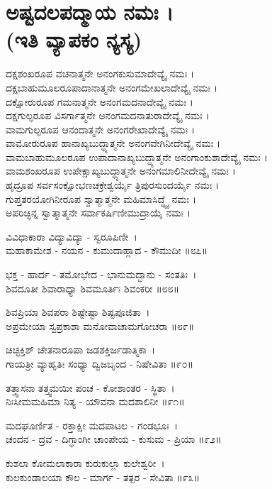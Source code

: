 \section{ಅಷ್ಟದಲಪದ್ಮಾಯ ನಮಃ ।\\ (ಇತಿ ವ್ಯಾಪಕಂ ನ್ಯಸ್ಯ)}
ದಕ್ಷಶಂಖರೂಪ ವಚನಾತ್ಮನೇ ಅನಂಗಕುಸುಮಾದೇವ್ಯೈ ನಮಃ ।\\
ದಕ್ಷಬಾಹುಮೂಲರೂಪಾದಾನಾತ್ಮನೇ ಅನಂಗಮೇಖಲಾದೇವ್ಯೈ ನಮಃ ।\\
ದಕ್ಷೋರುರೂಪ ಗಮನಾತ್ಮನೇ ಅನಂಗಮದನಾದೇವ್ಯೈ ನಮಃ ।\\
ದಕ್ಷಗುಲ್ಫರೂಪ ವಿಸರ್ಗಾತ್ಮನೇ ಅನಂಗಮದನಾತುರಾದೇವ್ಯೈ ನಮಃ ।\\
ವಾಮಗುಲ್ಫರೂಪ ಆನಂದಾತ್ಮನೇ ಅನಂಗರೇಖಾದೇವ್ಯೈ ನಮಃ ।\\
ವಾಮೋರುರೂಪ ಹಾನಾಖ್ಯಬುದ್ಧ್ಯಾತ್ಮನೇ ಅನಂಗವೇಗಿನೀದೇವ್ಯೈ ನಮಃ ।\\
ವಾಮಬಾಹುಮೂಲರೂಪ ಉಪಾದಾನಾಖ್ಯಬುದ್ಧ್ಯಾತ್ಮನೇ ಅನಂಗಾಂಕುಶಾದೇವ್ಯೈ ನಮಃ ।\\
ವಾಮಶಂಖರೂಪ ಉಪೇಕ್ಷಾಖ್ಯಬುದ್ಧ್ಯಾತ್ಮನೇ ಅನಂಗಮಾಲಿನೀದೇವ್ಯೈ ನಮಃ ।\\
ಹೃದ್ರೂಪ ಸರ್ವಸಂಕ್ಷೋಭಣಚಕ್ರೇಶ್ವರ್ಯೈ ತ್ರಿಪುರಸುಂದರ್ಯೈ ನಮಃ ।\\
ಗುಪ್ತತರಯೋಗಿನೀರೂಪ ಸ್ವಾತ್ಮಾತ್ಮನೇ ಮಹಿಮಾಸಿದ್ಧ್ಯೈ ನಮಃ ।\\
ಅಪರಿಚ್ಛಿನ್ನ ಸ್ವಾತ್ಮಾತ್ಮನೇ ಸರ್ವಾಕರ್ಷಿಣೀಮುದ್ರಾಯೈ ನಮಃ ।

ವಿವಿಧಾಕಾರಾ ವಿದ್ಯಾವಿದ್ಯಾ - ಸ್ವರೂಪಿಣೀ~।\\
ಮಹಾಕಾಮೇಶ - ನಯನ - ಕುಮುದಾಹ್ಲಾದ - ಕೌಮುದೀ ॥೮೭॥

ಭಕ್ತ - ಹಾರ್ದ - ತಮೋಭೇದ - ಭಾನುಮದ್ಭಾನು - ಸಂತತಿಃ~।\\
ಶಿವದೂತೀ ಶಿವಾರಾಧ್ಯಾ ಶಿವಮೂರ್ತಿಃ ಶಿವಂಕರೀ ॥೮೮॥

ಶಿವಪ್ರಿಯಾ ಶಿವಪರಾ ಶಿಷ್ಟೇಷ್ಟಾ ಶಿಷ್ಟಪೂಜಿತಾ~।\\
ಅಪ್ರಮೇಯಾ ಸ್ವಪ್ರಕಾಶಾ ಮನೋವಾಚಾಮಗೋಚರಾ ॥೮೯॥

ಚಿಚ್ಛಕ್ತಿಶ್ ಚೇತನಾರೂಪಾ ಜಡಶಕ್ತಿರ್ಜಡಾತ್ಮಿಕಾ~।\\
ಗಾಯತ್ರೀ ವ್ಯಾಹೃತಿಃ ಸಂಧ್ಯಾ ದ್ವಿಜಬೃಂದ - ನಿಷೇವಿತಾ ॥೯೦॥

ತತ್ತ್ವಾಸನಾ ತತ್ತ್ವಮಯೀ ಪಂಚ - ಕೋಶಾಂತರ - ಸ್ಥಿತಾ~।\\
ನಿಃಸೀಮಮಹಿಮಾ ನಿತ್ಯ - ಯೌವನಾ ಮದಶಾಲಿನೀ ॥೯೧॥

ಮದಘೂರ್ಣಿತ - ರಕ್ತಾಕ್ಷೀ ಮದಪಾಟಲ - ಗಂಡಭೂಃ~।\\
ಚಂದನ - ದ್ರವ - ದಿಗ್ಧಾಂಗೀ ಚಾಂಪೇಯ - ಕುಸುಮ - ಪ್ರಿಯಾ ॥೯೨॥

ಕುಶಲಾ ಕೋಮಲಾಕಾರಾ ಕುರುಕುಲ್ಲಾ ಕುಲೇಶ್ವರೀ~।\\
ಕುಲಕುಂಡಾಲಯಾ ಕೌಲ - ಮಾರ್ಗ - ತತ್ಪರ - ಸೇವಿತಾ ॥೯೩॥

